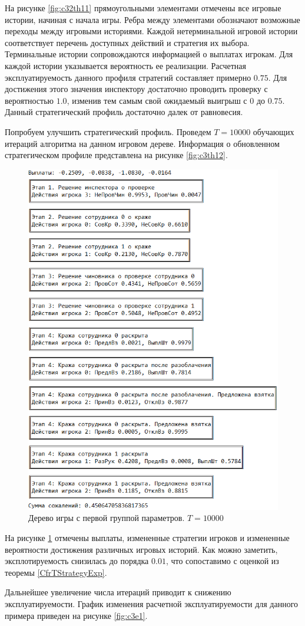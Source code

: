 \par
На рисунке \ref{fig:c32th11} прямоугольными элементами отмечены все игровые истории, начиная с начала игры. Ребра между элементами обозначают возможные переходы между игровыми историями. Каждой нетерминальной игровой истории соответствует перечень доступных действий и стратегия их выбора. Терминальные истории сопровождаются информацией о выплатах игрокам. Для каждой истории указывается вероятность ее реализации. Расчетная эксплуатируемость данного профиля стратегий составляет примерно $0.75$. Для достижения этого значения инспектору достаточно проводить проверку с вероятностью $1.0$, изменив тем самым свой ожидаемый выигрыш с $0$ до $0.75$. Данный стратегический профиль достаточно далек от равновесия.
\par
Попробуем улучшить стратегический профиль. Проведем $T=10000$ обучающих итераций алгоритма на данном игровом дереве. Информация о обновленном стратегическом профиле представлена на рисунке \ref{fig:c3th12}.
\begin{figure}[H]
	\centering
	\includegraphics[width=0.8\linewidth]{inc/img/c32th12}
	\caption{Дерево игры с первой группой параметров. $T = 10000$}
	\label{fig:c32th12}
\end{figure}
\par
На рисунке \ref{fig:c32th12} отмечены выплаты, измененные стратегии игроков и измененные вероятности достижения различных игровых историй. Как можно заметить, эксплотируемость снизилась до порядка $0.01$, что сопоставимо с оценкой из теоремы \ref{CfrTStrategyExp}.
\par
Дальнейшее увеличение числа итераций приводит к снижению эксплуатируемости. График изменения расчетной эксплуатируемости для данного примера приведен на рисунке \ref{fig:c3e1}.

